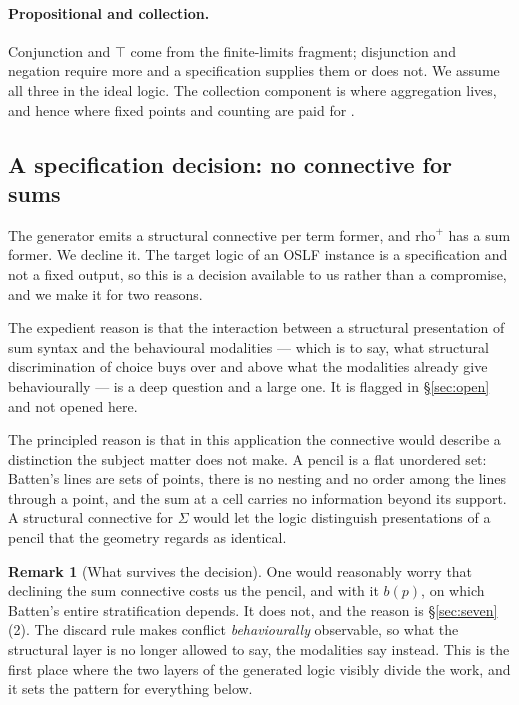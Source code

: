 \documentclass[11pt]{article}
\theoremstyle{plain}
\theoremstyle{definition}
\newtheorem{remark}[theorem]{Remark}
\newcommand{\rhoplus}{\mathrm{rho}^{+}}
\begin{document}
\paragraph{Propositional and collection.}
Conjunction and $\top$ come from the finite-limits fragment; disjunction and negation require more
and a specification supplies them or does not. We assume all three in the ideal logic. The
collection component is where aggregation lives, and hence where fixed points and counting are paid
for \cite{Zeus}.

\subsection{A specification decision: no connective for sums}
\label{sec:nosums}

The generator emits a structural connective per term former, and $\rhoplus$ has a sum former. We
decline it. The target logic of an OSLF instance is a specification and not a fixed output, so
this is a decision available to us rather than a compromise, and we make it for two reasons.

The expedient reason is that the interaction between a structural presentation of sum syntax and
the behavioural modalities --- which is to say, what structural discrimination of choice buys over
and above what the modalities already give behaviourally --- is a deep question and a large one.
It is flagged in \S\ref{sec:open} and not opened here.

The principled reason is that in this application the connective would describe a distinction the
subject matter does not make. A pencil is a flat unordered set: Batten's lines are sets of points,
there is no nesting and no order among the lines through a point, and the sum at a cell carries no
information beyond its support. A structural connective for $\Sigma$ would let the logic
distinguish presentations of a pencil that the geometry regards as identical.

\begin{remark}[What survives the decision]
One would reasonably worry that declining the sum connective costs us the pencil, and with it
$b(p)$, on which Batten's entire stratification depends. It does not, and the reason is
\S\ref{sec:seven}(2). The discard rule makes conflict \emph{behaviourally} observable, so what the
structural layer is no longer allowed to say, the modalities say instead. This is the first place
where the two layers of the generated logic visibly divide the work, and it sets the pattern for
everything below.
\end{remark}
\end{document}
